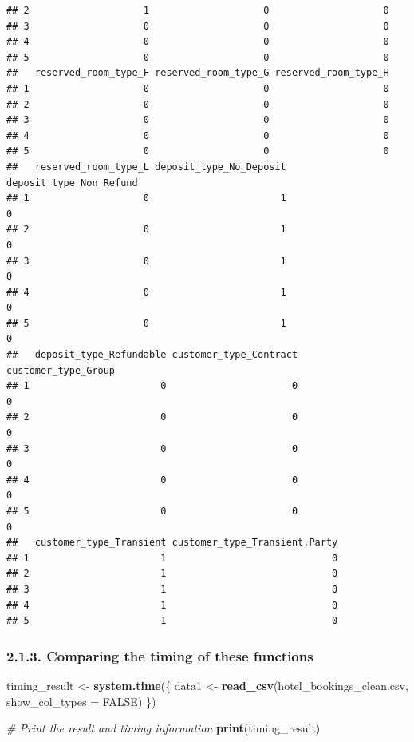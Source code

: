 \documentclass[
]{article}
\newenvironment{Shaded}{\begin{snugshade}}{\end{snugshade}}
\newcommand{\AttributeTok}[1]{\textcolor[rgb]{0.13,0.29,0.53}{#1}}
\newcommand{\CommentTok}[1]{\textcolor[rgb]{0.56,0.35,0.01}{\textit{#1}}}
\newcommand{\ConstantTok}[1]{\textcolor[rgb]{0.56,0.35,0.01}{#1}}
\newcommand{\FunctionTok}[1]{\textcolor[rgb]{0.13,0.29,0.53}{\textbf{#1}}}
\newcommand{\NormalTok}[1]{#1}
\newcommand{\OtherTok}[1]{\textcolor[rgb]{0.56,0.35,0.01}{#1}}
\newcommand{\StringTok}[1]{\textcolor[rgb]{0.31,0.60,0.02}{#1}}
\begin{document}
\begin{verbatim}
## 2                    1                    0                    0
## 3                    0                    0                    0
## 4                    0                    0                    0
## 5                    0                    0                    0
##   reserved_room_type_F reserved_room_type_G reserved_room_type_H
## 1                    0                    0                    0
## 2                    0                    0                    0
## 3                    0                    0                    0
## 4                    0                    0                    0
## 5                    0                    0                    0
##   reserved_room_type_L deposit_type_No_Deposit deposit_type_Non_Refund
## 1                    0                       1                       0
## 2                    0                       1                       0
## 3                    0                       1                       0
## 4                    0                       1                       0
## 5                    0                       1                       0
##   deposit_type_Refundable customer_type_Contract customer_type_Group
## 1                       0                      0                   0
## 2                       0                      0                   0
## 3                       0                      0                   0
## 4                       0                      0                   0
## 5                       0                      0                   0
##   customer_type_Transient customer_type_Transient.Party
## 1                       1                             0
## 2                       1                             0
## 3                       1                             0
## 4                       1                             0
## 5                       1                             0
\end{verbatim}

\hypertarget{comparing-the-timing-of-these-functions}{%
\subsubsection{2.1.3. Comparing the timing of these
functions}\label{comparing-the-timing-of-these-functions}}

\begin{Shaded}
\begin{Highlighting}[]
\NormalTok{timing\_result }\OtherTok{\textless{}{-}} \FunctionTok{system.time}\NormalTok{(\{}
\NormalTok{    data1 }\OtherTok{\textless{}{-}} \FunctionTok{read\_csv}\NormalTok{(}\StringTok{\textquotesingle{}hotel\_bookings\_clean.csv\textquotesingle{}}\NormalTok{, }\AttributeTok{show\_col\_types =} \ConstantTok{FALSE}\NormalTok{)}
\NormalTok{\})}

\CommentTok{\# Print the result and timing information}
\FunctionTok{print}\NormalTok{(timing\_result)}
\end{Highlighting}
\end{Shaded}
\end{document}
